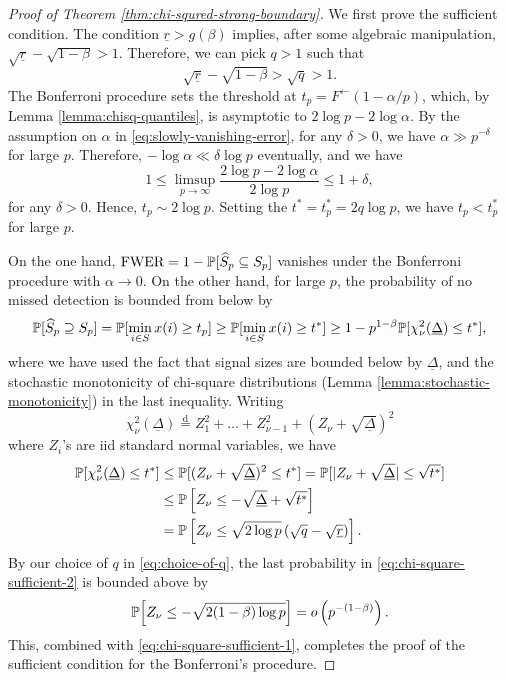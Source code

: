 \begin{proof}[Proof of Theorem \ref{thm:chi-squred-strong-boundary}]
We first prove the sufficient condition.
The condition $\underline{r} > {{g}}(\beta)$ implies, after some algebraic manipulation,
$\sqrt{\underline{r}} -\sqrt{1-\beta} > 1$.
Therefore, we can pick $q>1$ such that 
\begin{equation} \label{eq:choice-of-q}
    \sqrt{\underline{r}} -\sqrt{1-\beta} > \sqrt{q} > 1.
\end{equation}
The Bonferroni procedure sets the threshold at $t_p = F^\leftarrow(1-\alpha/p)$, which, by Lemma \ref{lemma:chisq-quantiles}, is asymptotic to $2\log{p} - 2\log{\alpha}$.
By the assumption on $\alpha$ in \eqref{eq:slowly-vanishing-error}, for any $\delta>0$, we have $\alpha\gg p^{-\delta}$ for large $p$.
Therefore, $-\log\alpha\ll\delta\log{p}$ eventually, and we have
$$
1 \le \limsup_{p\to\infty}\frac{2\log{p} - 2\log{\alpha}}{2\log{p}} \le 1+\delta,
$$
for any $\delta>0$.
Hence, $t_p\sim 2\log{p}$.
Setting the $t^* = t^*_p = 2q\log{p}$, we have $t_p < t^*_p$ for large $p$.


On the one hand, $\text{FWER} = 1 - \P[\widehat{S}_p \subseteq S_p]$ vanishes under the Bonferroni procedure with $\alpha\to0$.
On the other hand, for large $p$, the probability of no missed detection is bounded from below by
\begin{equation} \label{eq:chi-square-sufficient-1}
    \P[\widehat{S}_p \supseteq S_p] 
    = \P[\min_{i\in S} x(i) \ge t_p] 
    \ge \P[\min_{i\in S} x(i) \ge t^*] 
    \ge 1 - p^{1-\beta}\P[\chi_\nu^2(\underline{\Delta}) \le t^*],
\end{equation}
where we have used the fact that signal sizes are bounded below by $\underline{\Delta}$, and the stochastic monotonicity of chi-square distributions (Lemma \ref{lemma:stochastic-monotonicity}) in the last inequality.
Writing
$$
\chi_\nu^2(\underline{\Delta}) \stackrel{\mathrm{d}}{=} Z_1^2 + \ldots + Z_{\nu-1}^2 + (Z_\nu + \sqrt{\underline{\Delta}})^2
$$
where $Z_i$'s are iid standard normal variables, we have
\begin{align}
    \P[\chi_\nu^2({\underline{\Delta}}) \le t^*]
    &\le \P[(Z_\nu+\sqrt{\underline{\Delta}})^2 \le t^*] 
    = \P[|Z_\nu+\sqrt{\underline{\Delta}}| \le \sqrt{t^*}]  \nonumber \\
    &\le \P\left[Z_\nu \le - \sqrt{\underline{\Delta}} +  \sqrt{t^*}\right] \nonumber \\
    &= \P\left[Z_\nu \le \sqrt{2\log{p}}\left(\sqrt{q} - \sqrt{\underline{r}}\right)\right]. \label{eq:chi-square-sufficient-2}
\end{align}
By our choice of $q$ in \eqref{eq:choice-of-q}, the last probability in \eqref{eq:chi-square-sufficient-2}
is bounded above by 
$$
\P\Big[Z_\nu \le -\sqrt{2(1-\beta)\log{p}}\Big] = o\left(p^{-(1-\beta)}\right).
$$
This, combined with \eqref{eq:chi-square-sufficient-1}, completes the proof of the sufficient condition for the Bonferroni's procedure.


\end{proof}
